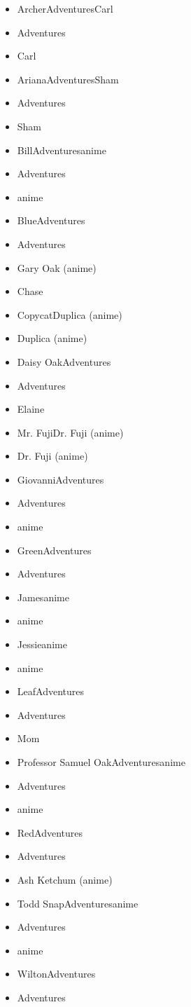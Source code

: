 \documentclass[a4paper,12pt]{article}
\begin{document}
\begin{itemize}
\item ArcherAdventuresCarl
\item Adventures
\item Carl
\item ArianaAdventuresSham
\item Adventures
\item Sham
\item BillAdventuresanime
\item Adventures
\item anime
\item BlueAdventures
\item Adventures
\item Gary Oak (anime)
\item Chase
\item CopycatDuplica (anime)
\item Duplica (anime)
\item Daisy OakAdventures
\item Adventures
\item Elaine
\item Mr. FujiDr. Fuji (anime)
\item Dr. Fuji (anime)
\item GiovanniAdventures
\item Adventures
\item anime
\item GreenAdventures
\item Adventures
\item Jamesanime
\item anime
\item Jessieanime
\item anime
\item LeafAdventures
\item Adventures
\item Mom
\item Professor Samuel OakAdventuresanime
\item Adventures
\item anime
\item RedAdventures
\item Adventures
\item Ash Ketchum (anime)
\item Todd SnapAdventuresanime
\item Adventures
\item anime
\item WiltonAdventures
\item Adventures
\end{itemize}\\ \par \vspace{0.5cm}
\end{document}
